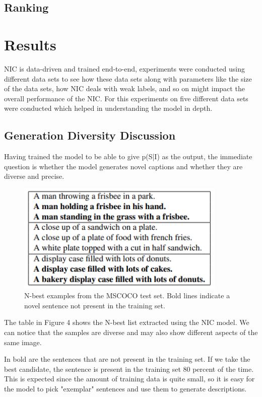 \documentclass[a4paper,UKenglish,cleveref, autoref, thm-restate]{lipics-v2021}
\begin{document}
\subsection{Ranking}


\section{Results}
NIC is data-driven and trained end-to-end, experiments were conducted using different data sets to see how these data sets along with parameters like the size of the data sets, how NIC deals with weak labels, and so on might impact the overall performance of the NIC. For this experiments on five different data sets were conducted which helped in understanding the model in depth.

\subsection{Generation Diversity Discussion}
Having trained the model to be able to give p(S|I) as the output, the immediate question is whether the model generates novel captions and whether they are diverse and precise.
\begin{figure}[ht]
    \centering
    \includegraphics[width=10cm]{images/Novel_Samples.png}
    \caption{N-best examples from the MSCOCO test set. Bold lines indicate a novel sentence not present in the training set.}
    \label{fig:}
\end{figure}

The table in Figure 4 shows the N-best list extracted using the NIC model. We can notice that the samples are diverse and may also show different aspects of the same image.

In bold are the sentences that are not present in the training set. If we take the best candidate, the sentence is present in the training set 80 percent of the time. This is expected since the amount of training data is quite small, so it is easy for the model to pick "exemplar" sentences and use them to generate descriptions.
\end{document}
